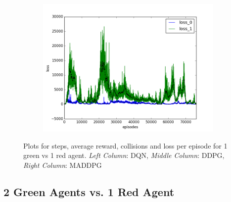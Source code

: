\begin{figure}[t]
\begin{subfigure}[t]{\figscale\linewidth}
    \includegraphics[width=1.5\textwidth]
    {../results/maddpg_1vs1/loss.png}
    \label{fig:maddpg-1vs1-loss}
  \end{subfigure}

  \caption{Plots for steps, average reward, collisions and loss per episode for 1 green vs 1 red agent. \textit{Left Column}: DQN, \textit{Middle Column}: DDPG, \textit{Right Column}: MADDPG}
  \label{fig:1vs1}
\end{figure}
\FloatBarrier

\subsection{2 Green Agents vs. 1 Red Agent}
\label{sec:experiment:1vs2}

